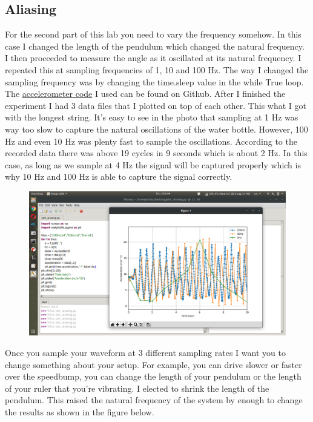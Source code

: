\subsection{Aliasing}
For the second part of this lab you need to vary the frequency somehow. In this case I changed the length of the pendulum which changed the natural frequency. I then proceeded to measure the angle as it oscillated at its natural frequency. I repeated this at sampling frequencies of 1, 10 and 100 Hz. The way I changed the sampling frequency was by changing the time.sleep value in the while True loop. The \href{https://github.com/cmontalvo251/Microcontrollers/blob/master/Circuit_Playground/CircuitPython/Accelerometer/low_level_accel.py}{accelerometer code} I used can be found on Github. After I finished the experiment I had 3 data files that I plotted on top of each other. This what I got with the longest string. It’s easy to see in the photo that sampling at 1 Hz was way too slow to capture the natural oscillations of the water bottle. However, 100 Hz and even 10 Hz was plenty fast to sample the oscillations. According to the recorded data there was above 19 cycles in 9 seconds which is about 2 Hz. In this case, as long as we sample at 4 Hz the signal will be captured properly which is why 10 Hz and 100 Hz is able to capture the signal correctly.
\begin{figure}[H]
  \begin{center}
    \includegraphics[width=\textwidth]{Figures/aliasing.png}
  \end{center}
\end{figure}
Once you sample your waveform at 3 different sampling rates I want you to change something about your setup. For example, you can drive slower or faster over the speedbump, you can change the length of your pendulum or the length of your ruler that you’re vibrating. I elected to shrink the length of the pendulum. This raised the natural frequency of the system by enough to change the results as shown in the figure below.
